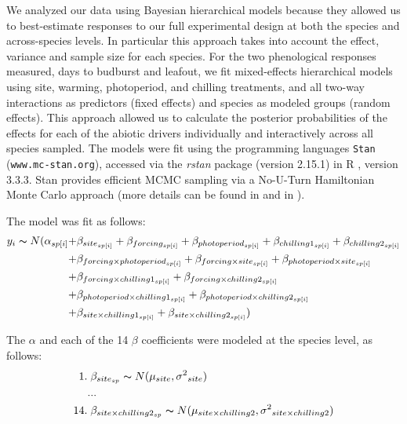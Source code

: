 \documentclass[11pt]{article}
\begin{document}
\noindent We analyzed our data using Bayesian hierarchical models because they allowed us to best-estimate responses to our full experimental design at both the species and across-species levels. In particular this approach takes into account the effect, variance and sample size for each species. For the two phenological responses measured, days to budburst and leafout, we fit mixed-effects hierarchical models using site, warming, photoperiod, and chilling treatments, and all two-way interactions as predictors (fixed effects) and species as modeled groups (random effects). This approach allowed us to calculate the posterior probabilities of the effects for each of the abiotic drivers individually and interactively across all species sampled. The models were fit using the programming languages \texttt{Stan} \citep{Carpenter:2016aa}(\texttt{www.mc-stan.org}), accessed via the \textit{rstan} package (version 2.15.1) in R \citep{Rcore:2017}, version 3.3.3. Stan provides efficient MCMC sampling via a No-U-Turn Hamiltonian Monte Carlo approach (more details can be found in \citet{BDA} and in \citet{Carpenter:2016aa}).

The model was fit as follows:
\begin{align*}
y_i \thicksim N(\alpha_{sp[i]} +& \beta_{site_{sp[i]}} + \beta_{forcing_{sp[i]}} + \beta_{photoperiod_{sp[i]}} + \beta_{chilling1_{sp[i]}} + \beta_{chilling2_{sp[i]}}  \\
	+& \beta_{forcing \times photoperiod_{sp[i]}} + \beta_{forcing \times site_{sp[i]}} + \beta_{photoperiod \times site_{sp[i]}} \\
	+& \beta_{forcing  \times chilling1_{sp[i]}} + \beta_{forcing \times chilling2_{sp[i]}} \\
	+& \beta_{photoperiod \times chilling1_{sp[i]}} + \beta_{photoperiod \times chilling2_{sp[i]}} \\
	+& \beta_{site \times chilling1_{sp[i]}}  + \beta_{site \times chilling2_{sp[i]}} )
\end{align*}

\noindent The $\alpha$ and each of the 14 $\beta$ coefficients were modeled at the species level, as follows:
\begin{align*}
1.& \; \beta_{site_{sp}} \thicksim N(\mu_{site}, \sigma{^2}_{site}) \\
   &... \\
14.& \; \beta_{site \times chilling2_{sp}} \thicksim N(\mu_{site \times chilling2}, \sigma{^2}_{site \times chilling2})
\end{align*}
\end{document}
